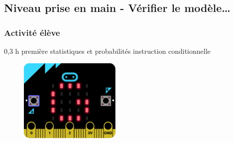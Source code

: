 %
%

\newpage

\subsection{Niveau prise en main - Vérifier le modèle\ldots}

\subsubsection{Activité élève}

\cartouche
{0,3 h}         %
{première}           %
{statistiques et probabilités}        %
{}     %
{instruction conditionnelle}       %


\begin{figure}
    \includegraphics[width=\linewidth]{res/mb-fluctuations-illustration.png}
\end{figure}

